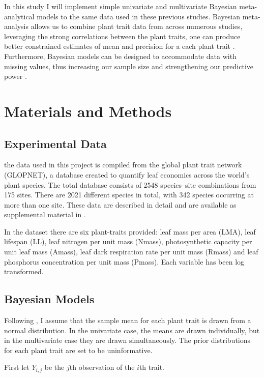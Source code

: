 \documentclass[12pt,fleqn]{article}
\begin{document}
In this study I will implement simple univariate and multivariate Bayesian meta-analytical models to the same data used in these previous studies. Bayesian meta-analysis allows us to combine plant trait data from across numerous studies, leveraging the strong correlations between the plant traits, one can produce better constrained estimates of mean and precision for a each plant trait \citep{Dietze2014} . Furthermore, Bayesian models can be designed to accommodate data with missing values, thus increasing our sample size and strengthening our predictive power \citep{Clark2007}.

\section{Materials and Methods}

\subsection{Experimental Data}
the data used in this project is compiled from the global plant trait network (GLOPNET), a database created to quantify leaf economics across the world’s plant species. The total database consists of 2548 species–site combinations from 175 sites. There are 2021 different species in total, with 342 species occurring at more than one site. These data are described in detail and are available as supplemental material in \citep{Wright}. 

In the dataset there are six plant-traits provided: leaf mass per area (LMA), leaf lifespan (LL), leaf nitrogen per unit mass (Nmass), photosynthetic capacity per unit leaf mass (Amass), leaf dark respiration rate per unit mass (Rmass) and leaf phosphorus concentration per unit mass (Pmass). Each variable has been log transformed. 

\subsection{Bayesian Models}

Following \citep{LEBAUER2013}, I assume that the sample mean for each plant trait is drawn from a normal distribution. In the univariate case, the means are drawn individually, but in the multivariate case they are drawn simultaneously. The prior distributions for each plant trait are set to be uninformative. 

\noindent First let $Y_{i,j}$ be the $j$th observation of the $i$th trait.
\end{document}
